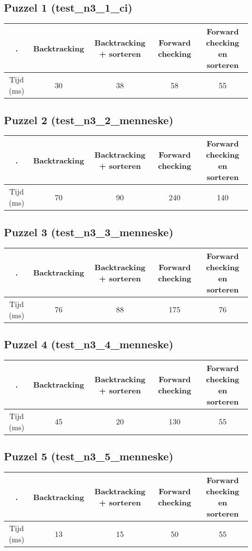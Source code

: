 \documentclass[]{report}
\begin{document}
\begin{appendices}
\subsection{Puzzel 1 (test\_n3\_1\_ci)}
\begin{tabular}{|c||c|c|c|c|}
\hline . & Backtracking & Backtracking + sorteren & Forward checking & Forward checking en sorteren \\ 
\hline \hline Tijd (ms) & 30 & 38 & 58 & 55 \\ 
\hline 
\end{tabular}
\subsection{Puzzel 2 (test\_n3\_2\_menneske)}
\begin{tabular}{|c||c|c|c|c|}
\hline . & Backtracking & Backtracking + sorteren & Forward checking & Forward checking en sorteren \\ 
\hline \hline Tijd (ms) & 70 & 90 & 240 & 140 \\ 
\hline 
\end{tabular}
\subsection{Puzzel 3 (test\_n3\_3\_menneske)}
\begin{tabular}{|c||c|c|c|c|}
\hline . & Backtracking & Backtracking + sorteren & Forward checking & Forward checking en sorteren \\ 
\hline \hline Tijd (ms) & 76 & 88 & 175 & 76 \\ 
\hline 
\end{tabular}
\subsection{Puzzel 4 (test\_n3\_4\_menneske)}
\begin{tabular}{|c||c|c|c|c|}
\hline . & Backtracking & Backtracking + sorteren & Forward checking & Forward checking en sorteren \\ 
\hline \hline Tijd (ms) & 45 & 20 & 130 & 55 \\ 
\hline 
\end{tabular}
\subsection{Puzzel 5 (test\_n3\_5\_menneske)}
\begin{tabular}{|c||c|c|c|c|}
\hline . & Backtracking & Backtracking + sorteren & Forward checking & Forward checking en sorteren \\ 
\hline \hline Tijd (ms) & 13 & 15 & 50 & 55 \\ 
\hline 
\end{tabular}

\end{appendices}
\end{document}
